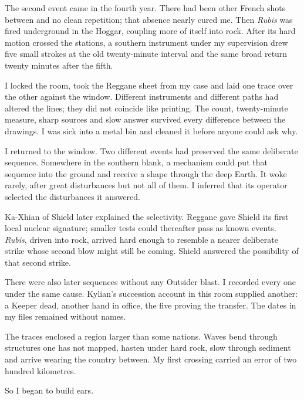 The second event came in the fourth year. There had been other French shots between and no clean repetition; that absence nearly cured me. Then \emph{Rubis} was fired underground in the Hoggar, coupling more of itself into rock. After its hard motion crossed the stations, a southern instrument under my supervision drew five small strokes at the old twenty-minute interval and the same broad return twenty minutes after the fifth.\par

I locked the room, took the Reggane sheet from my case and laid one trace over the other against the window. Different instruments and different paths had altered the lines; they did not coincide like printing. The count, twenty-minute measure, sharp sources and slow answer survived every difference between the drawings. I was sick into a metal bin and cleaned it before anyone could ask why.\par

I returned to the window. Two different events had preserved the same deliberate sequence. Somewhere in the southern blank, a mechanism could put that sequence into the ground and receive a shape through the deep Earth. It woke rarely, after great disturbances but not all of them. I inferred that its operator selected the disturbances it answered.\par

Ka-Xhian of Shield later explained the selectivity. Reggane gave Shield its first local nuclear signature; smaller tests could thereafter pass as known events. \emph{Rubis}, driven into rock, arrived hard enough to resemble a nearer deliberate strike whose second blow might still be coming. Shield answered the possibility of that second strike.\par

There were also later sequences without any Outsider blast. I recorded every one under the same cause. Kylian's succession account in this room supplied another: a Keeper dead, another hand in office, the five proving the transfer. The dates in my files remained without names.\par

The traces enclosed a region larger than some nations. Waves bend through structures one has not mapped, hasten under hard rock, slow through sediment and arrive wearing the country between. My first crossing carried an error of two hundred kilometres.\par

So I began to build ears.\par

